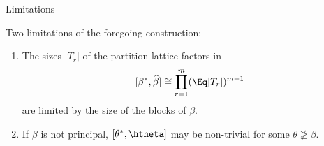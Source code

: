 \documentclass[xcolor=dvipsnames,9pt,hide notes]{beamer}
\begin{document}

\begin{frame}[fragile,label=Limitations,shrink=5]{Limitations}

\vskip5mm

Two limitations of the foregoing construction:
\begin{enumerate}
\item The sizes $|T_r|$ of the partition lattice factors in 
\[
[\beta^*, \widehat{\beta}] \cong \prod_{r=1}^m (\Eq |T_r|)^{m-1}
\] 
are limited by the size of the blocks of $\beta$.

\vskip3mm

\item If $\beta$ is not principal, 
$[\theta^*, \htheta]$ may be non-trivial for some $\theta \ngeq \beta$.
\end{enumerate}
\end{frame}
\end{document}
